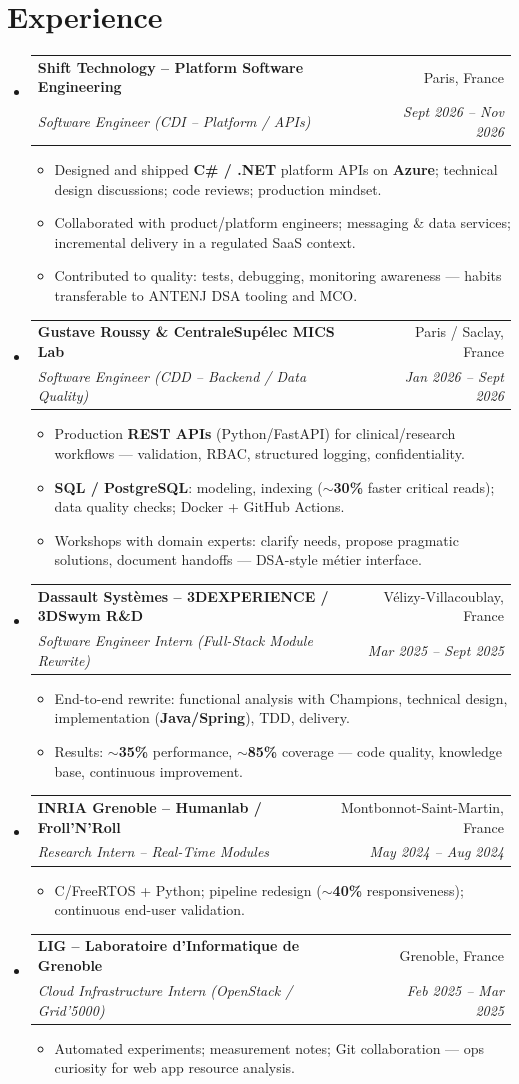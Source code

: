 \documentclass[letterpaper,10.5pt]{article}
\makeatletter
\newcommand{\resumeItem}[1]{\item\small{#1 \vspace{-1.5pt}}}
\newcommand{\resumeSubheading}[4]{\vspace{-1pt}\item\begin{tabular*}{0.97\textwidth}[t]{l@{\extracolsep{\fill}}r}\textbf{#1} & #2 \\\textit{\small#3} & \textit{\small #4} \\\end{tabular*}\vspace{-5pt}}
\newcommand{\resumeSubHeadingListStart}{\begin{itemize}[leftmargin=0.15in, label={}]}
\newcommand{\resumeSubHeadingListEnd}{\end{itemize}}
\newcommand{\resumeItemListStart}{\begin{itemize}[leftmargin=0.18in]}
\newcommand{\resumeItemListEnd}{\end{itemize}\vspace{-3pt}}
\makeatother
\begin{document}
\section{Experience}
\resumeSubHeadingListStart
  \resumeSubheading
    {Shift Technology -- Platform Software Engineering}{Paris, France}
    {Software Engineer (CDI -- Platform / APIs)}{Sept 2026 -- Nov 2026}
    \resumeItemListStart
      \resumeItem{Designed and shipped \textbf{C\# / .NET} platform APIs on \textbf{Azure}; technical design discussions; code reviews; production mindset.}
      \resumeItem{Collaborated with product/platform engineers; messaging \& data services; incremental delivery in a regulated SaaS context.}
      \resumeItem{Contributed to quality: tests, debugging, monitoring awareness --- habits transferable to ANTENJ DSA tooling and MCO.}
    \resumeItemListEnd
  \resumeSubheading
    {Gustave Roussy \& CentraleSup\'elec MICS Lab}{Paris / Saclay, France}
    {Software Engineer (CDD -- Backend / Data Quality)}{Jan 2026 -- Sept 2026}
    \resumeItemListStart
      \resumeItem{Production \textbf{REST APIs} (Python/FastAPI) for clinical/research workflows --- validation, RBAC, structured logging, confidentiality.}
      \resumeItem{\textbf{SQL / PostgreSQL}: modeling, indexing (\textbf{$\sim$30\%} faster critical reads); data quality checks; Docker + GitHub Actions.}
      \resumeItem{Workshops with domain experts: clarify needs, propose pragmatic solutions, document handoffs --- DSA-style m\'etier interface.}
    \resumeItemListEnd
  \resumeSubheading
    {Dassault Syst\`emes -- 3DEXPERIENCE / 3DSwym R\&D}{V\'elizy-Villacoublay, France}
    {Software Engineer Intern (Full-Stack Module Rewrite)}{Mar 2025 -- Sept 2025}
    \resumeItemListStart
      \resumeItem{End-to-end rewrite: functional analysis with Champions, technical design, implementation (\textbf{Java/Spring}), TDD, delivery.}
      \resumeItem{Results: \textbf{$\sim$35\%} performance, \textbf{$\sim$85\%} coverage --- code quality, knowledge base, continuous improvement.}
    \resumeItemListEnd
  \resumeSubheading
    {INRIA Grenoble -- Humanlab / Froll'N'Roll}{Montbonnot-Saint-Martin, France}
    {Research Intern -- Real-Time Modules}{May 2024 -- Aug 2024}
    \resumeItemListStart
      \resumeItem{C/FreeRTOS + Python; pipeline redesign (\textbf{$\sim$40\%} responsiveness); continuous end-user validation.}
    \resumeItemListEnd
  \resumeSubheading
    {LIG -- Laboratoire d'Informatique de Grenoble}{Grenoble, France}
    {Cloud Infrastructure Intern (OpenStack / Grid'5000)}{Feb 2025 -- Mar 2025}
    \resumeItemListStart
      \resumeItem{Automated experiments; measurement notes; Git collaboration --- ops curiosity for web app resource analysis.}
    \resumeItemListEnd
\resumeSubHeadingListEnd
\end{document}

